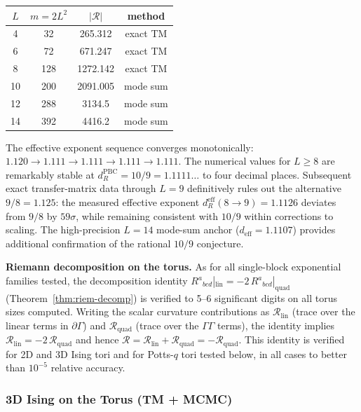 \documentclass[11pt]{article}
\theoremstyle{definition}
\theoremstyle{remark}
\newcommand{\Ric}{R}
\newcommand{\Scal}{\mathcal{R}}
\begin{document}
\begin{center}
\renewcommand{\arraystretch}{1.2}
\begin{tabular}{cccc}
\toprule
$L$ & $m = 2L^2$ & $|\Scal|$ & method \\
\midrule
4  & 32  & 265.312  & exact TM \\
6  & 72  & 671.247  & exact TM \\
8  & 128 & 1272.142 & exact TM \\
10 & 200 & 2091.005 & mode sum \\
12 & 288 & 3134.5\phantom{00}  & mode sum \\
14 & 392 & 4416.2\phantom{00}  & mode sum \\
\bottomrule
\end{tabular}
\end{center}

The effective exponent sequence converges monotonically:
$1.120 \to 1.111 \to 1.111 \to 1.111 \to 1.111$.
The numerical values for $L \geq 8$ are remarkably stable at
$d_R^{\mathrm{PBC}} = 10/9 = 1.1111\ldots$ to four decimal places.
Subsequent exact transfer-matrix data through $L = 9$ \cite{PredLetter}
definitively rules out the alternative $9/8 = 1.125$: the measured
effective exponent $d_R^{\mathrm{eff}}(8{\to}9) = 1.1126$ deviates from
$9/8$ by $59\sigma$, while remaining consistent with $10/9$ within
corrections to scaling. The high-precision $L=14$ mode-sum anchor
($d_{\mathrm{eff}} = 1.1107$) provides additional confirmation of the
rational $10/9$ conjecture.

\noindent\textbf{Riemann decomposition on the torus.}
As for all single-block exponential families tested, the decomposition
identity $\Ric^a{}_{bcd}|_{\mathrm{lin}} = -2\,\Ric^a{}_{bcd}|_{\mathrm{quad}}$
(Theorem~\ref{thm:riem-decomp}) is verified to 5--6 significant digits
on all torus sizes computed. Writing the scalar curvature contributions
as $\Scal_{\mathrm{lin}}$ (trace over the linear terms in $\partial\Gamma$)
and $\Scal_{\mathrm{quad}}$ (trace over the $\Gamma\Gamma$ terms), the identity
implies $\Scal_{\mathrm{lin}} = -2\,\Scal_{\mathrm{quad}}$ and hence
$\Scal = \Scal_{\mathrm{lin}} + \Scal_{\mathrm{quad}} = -\Scal_{\mathrm{quad}}$.
This identity is verified for 2D and 3D Ising tori
and for Potts-$q$ tori tested below, in all cases to better than $10^{-5}$ relative accuracy.

\subsubsection{3D Ising on the Torus (TM + MCMC)}
\end{document}
